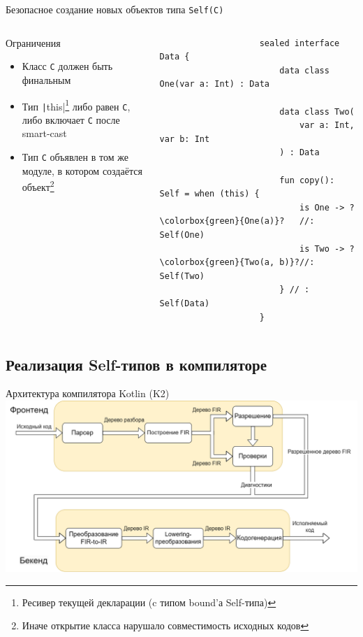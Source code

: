 \documentclass[handout,aspectratio=169,usenames,dvipsnames]{beamer}
\begin{document}
    \begin{frame}[fragile]{Безопасное создание новых объектов типа \texttt{Self(C)}}
        \begin{columns}[onlytextwidth]
            \begin{column}[t]{0.46\textwidth}
                \begin{block}{Ограничения}
                    \begin{itemize}
                        \item Класс \texttt{C} должен быть финальным
                        \item Тип \texttt|this|\footnote{Ресивер текущей декларации (c типом bound'а Self-типа)} либо равен \texttt{С}, либо включает \texttt{C} после smart-cast
                        \item Тип \texttt{C} объявлен в том же модуле, в котором создаётся объект\footnote{Иначе открытие класса нарушало совместимость исходных кодов}
                    \end{itemize}
                \end{block}
            \end{column}\hfill%
            \begin{column}[t]{0.50\textwidth}
                \begin{verbatim}
                    sealed interface Data {
                        data class One(var a: Int) : Data

                        data class Two(
                            var a: Int, var b: Int
                        ) : Data

                        fun copy(): Self = when (this) {
                            is One -> ?\colorbox{green}{One(a)}?   //: Self(One)
                            is Two -> ?\colorbox{green}{Two(a, b)}?//: Self(Two)
                        } // : Self(Data)
                    }
                \end{verbatim}
            \end{column}
        \end{columns}
    \end{frame}


    \subsection{Реализация Self-типов в компиляторе}

    \begin{frame}{Архитектура компилятора Kotlin (K2)}
        \includegraphics[width=\textwidth]{fig/arch}
    \end{frame}
\end{document}
